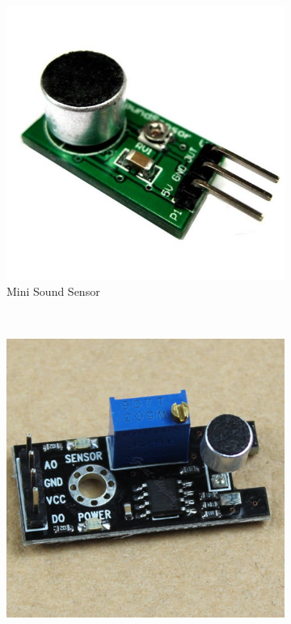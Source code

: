 \documentclass[12pt, a4paper,twoside]{tesi_upf}
\begin{document}
      \begin{figure}
        \centering
        \begin{subfigure}[b]{0.3\textwidth}
                \includegraphics[width=\textwidth]{./Figures/MiniSoundSensor.jpg}
                \caption{Mini Sound Sensor}
                \label{fig:MSS}
        \end{subfigure}%
        ~ %
        \begin{subfigure}[b]{0.3\textwidth}
                \includegraphics[width=\textwidth]{./Figures/analognoisesensor.jpg}

\end{subfigure}
\end{figure}
\end{document}
